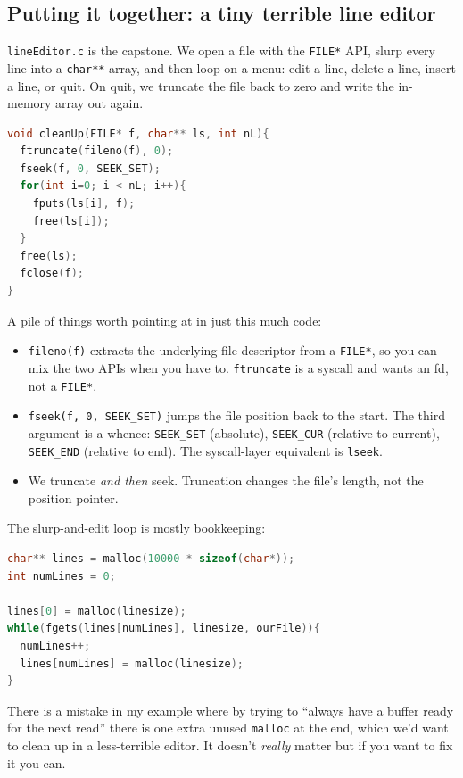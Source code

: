 \documentclass[11pt]{article}
\begin{document}
\subsection*{Putting it together: a tiny terrible line editor}

\texttt{lineEditor.c} is the capstone. We open a file with the
\texttt{FILE*} API, slurp every line into a \texttt{char**} array,
and then loop on a menu: edit a line, delete a line, insert a line,
or quit. On quit, we truncate the file back to zero and write the
in-memory array out again.

\begin{lstlisting}[language=C]
void cleanUp(FILE* f, char** ls, int nL){
  ftruncate(fileno(f), 0);
  fseek(f, 0, SEEK_SET);
  for(int i=0; i < nL; i++){
    fputs(ls[i], f);
    free(ls[i]);
  }
  free(ls);
  fclose(f);
}
\end{lstlisting}

A pile of things worth pointing at in just this much code:
\begin{itemize}
  \item \texttt{fileno(f)} extracts the underlying file descriptor
    from a \texttt{FILE*}, so you can mix the two APIs when you
    have to. \texttt{ftruncate} is a syscall and wants an fd, not a
    \texttt{FILE*}.
  \item \texttt{fseek(f, 0, SEEK\_SET)} jumps the file position back
    to the start. The third argument is a whence: \texttt{SEEK\_SET}
    (absolute), \texttt{SEEK\_CUR} (relative to current),
    \texttt{SEEK\_END} (relative to end). The syscall-layer
    equivalent is \texttt{lseek}.
  \item We truncate \emph{and then} seek. Truncation changes the
    file's length, not the position pointer.
\end{itemize}

The slurp-and-edit loop is mostly bookkeeping:

\begin{lstlisting}[language=C]
char** lines = malloc(10000 * sizeof(char*));
int numLines = 0;

lines[0] = malloc(linesize);
while(fgets(lines[numLines], linesize, ourFile)){
  numLines++;
  lines[numLines] = malloc(linesize);
}
\end{lstlisting}

There is a mistake in my example where by trying to ``always have a buffer ready for the next read''
there is one extra unused \texttt{malloc} at the end, which we'd want
to clean up in a less-terrible editor. It doesn't \emph{really} matter but if you want to fix it you can.
\end{document}
